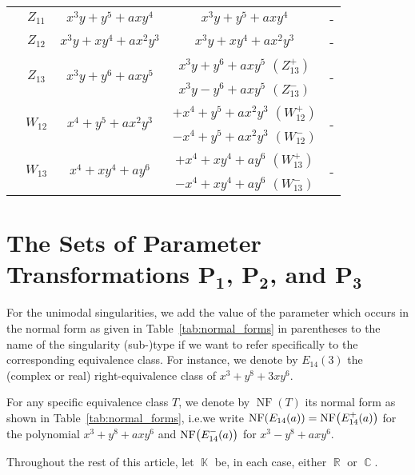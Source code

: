 \documentclass[noend]{amsproc}
\theoremstyle{definition}
\let\originalleft\left
\let\originalright\right
\renewcommand{\left}{\mathopen{}\mathclose\bgroup\originalleft}
\renewcommand{\right}{\aftergroup\egroup\originalright}
\DeclareMathOperator{\R}{\mathbb{R}}
\DeclareMathOperator{\C}{\mathbb{C}}
\DeclareMathOperator{\K}{\mathbb{K}}
\DeclareMathOperator{\NF}{NF}
\begin{document}
\begin{table}[tp]
\begin{tabular}{|c|c|c|c|c|}
& $Z_{11}$ & $x^3y+y^5+axy^4$ & $x^3y+y^5+axy^4$ & - \\ \cline{2-5}

& $Z_{12}$ & $x^3y+xy^4+ax^2y^3$ & $x^3y+xy^4+ax^2y^3$ & - \\ \cline{2-5}

& \multirow{2}{*}{$Z_{13}$} & \multirow{2}{*}{$x^3y+y^6+axy^5$}
  & $x^3y+y^6+axy^5$ $(Z_{13}^+)$ & \multirow{2}{*}{-} \\ \cline{4-4}
&&& $x^3y-y^6+axy^5$ $(Z_{13}^-)$ &                    \\ \cline{2-5}

& \multirow{2}{*}{$W_{12}$} & \multirow{2}{*}{$x^4+y^5+ax^2y^3$}
  & $+x^4+y^5+ax^2y^3$ $(W_{12}^+)$ & \multirow{2}{*}{-} \\ \cline{4-4}
&&& $-x^4+y^5+ax^2y^3$ $(W_{12}^-)$ &                    \\ \cline{2-5}

& \multirow{2}{*}{$W_{13}$} & \multirow{2}{*}{$x^4+xy^4+ay^6$}
  & $+x^4+xy^4+ay^6$ $(W_{13}^+)$ & \multirow{2}{*}{-} \\ \cline{4-4}
&&& $-x^4+xy^4+ay^6$ $(W_{13}^-)$ &                    \\ \hline

\end{tabular}
\end{table}


\section{The Sets of Parameter Transformations
$\boldsymbol{P_1}$, $\boldsymbol{P_2}$, and $\boldsymbol{P_3}$}

For the unimodal singularities, we add the value of the parameter which occurs
in the normal form as given in Table~\ref{tab:normal_forms} in parentheses to
the name of the singularity (sub-)type if we want to refer specifically to the
corresponding equivalence class. For instance, we denote by $E_{14}(3)$ the
(complex or real) right-equivalence class of $x^3+y^8+3xy^6$.

For any specific equivalence class $T$, we denote by $\NF(T)$ its normal form
as shown in Table~\ref{tab:normal_forms}, i.e.\@ we write
$\NF\left(E_{14}(a)\right) = \NF\left(E_{14}^+(a)\right)$ for the polynomial
$x^3+y^8+axy^6$ and $\NF\left(E_{14}^-(a)\right)$ for $x^3-y^8+axy^6$.

Throughout the rest of this article, let $\K$ be, in each case, either $\R$ or
$\C$.
\end{document}
